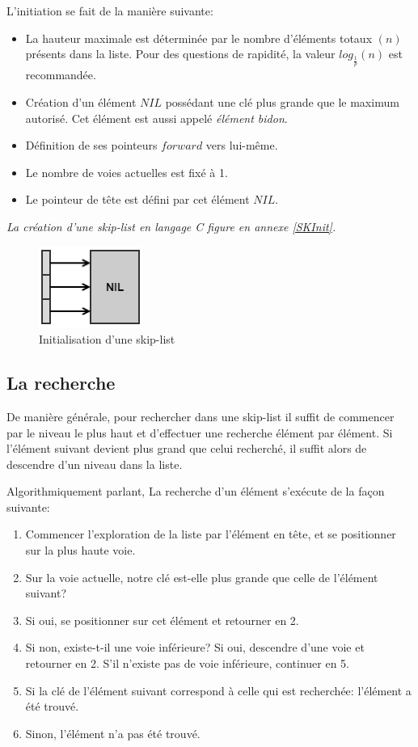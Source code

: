 \documentclass[hidelinks,a4paper, 12pt]{article}
\begin{document}
	L'initiation se fait de la manière suivante:
	\begin{itemize}
		\item La hauteur maximale est déterminée par le nombre d'éléments totaux $(n)$ présents dans la liste. Pour des questions de rapidité, la valeur $log_\frac{1}{p}(n)$ est recommandée.
		\item Création d'un élément $NIL$ possédant une clé plus grande que le maximum autorisé. Cet élément est aussi appelé \textit{élément bidon}.
		\item Définition de ses pointeurs $forward$ vers lui-même.
		\item Le nombre de voies actuelles est fixé à 1.
		\item Le pointeur de tête est défini par cet élément $NIL$.
	\end{itemize}
	\emph{La création d'une skip-list en langage C figure en annexe \ref{SKInit}.}
	
	\begin{figure}[h]
		\includegraphics[scale=0.95]{img/init}
		\caption{Initialisation d'une skip-list}
		\label{SkipInit}
	\end{figure}
	
	\newpage
	\subsection{La recherche}
	De manière générale, pour rechercher dans une skip-list il suffit de commencer par le niveau le plus haut et d'effectuer une recherche élément par élément. Si l'élément suivant devient plus grand que celui recherché, il suffit alors de descendre d'un niveau dans la liste.
	
	Algorithmiquement parlant, La recherche d'un élément s'exécute de la façon suivante:
	\begin{enumerate}
		\item Commencer l'exploration de la liste par l'élément en tête, et se positionner sur la plus haute voie.
		\item Sur la voie actuelle, notre clé est-elle plus grande que celle de l'élément suivant?
		\item Si oui, se positionner sur cet élément et retourner en 2.
		\item Si non, existe-t-il une voie inférieure?
		\subitem Si oui, descendre d'une voie et retourner en 2. 
		\subitem S'il n'existe pas de voie inférieure, continuer en 5.
		\subitem
		\item Si la clé de l'élément suivant correspond à celle qui est recherchée: l'élément a été trouvé.
		\item Sinon, l'élément n'a pas été trouvé.
	\end{enumerate}
	
\end{document}
